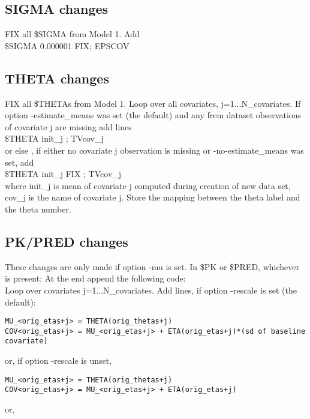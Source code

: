 \subsection{SIGMA changes}
FIX all \$SIGMA from Model 1.
Add\\
\$SIGMA 0.000001 FIX; EPSCOV

\subsection{THETA changes}
FIX all \$THETAs from Model 1.
Loop over all covariates, j=1...N\_covariates. %
If option -estimate\_means was set (the default)
and any frem dataset observations of covariate j are missing add lines\\
\$THETA init\_j ; TVcov\_j\\
or else , if either no covariate j observation is missing or
-no-estimate\_means was set, add \\
\$THETA init\_j FIX ; TVcov\_j\\
where init\_j is mean of covariate j computed during creation
of new data set, cov\_j is the name of covariate
j. %
Store the mapping between the theta label and the theta number.%
\subsection{PK/PRED changes}
These changes are only made if option -mu is set.
In \$PK or \$PRED, whichever is present:
At the end append the following code: \\
Loop over covariates j=1...N\_covariates. %
Add lines, if option -rescale is set (the default):
\begin{verbatim}
MU_<orig_etas+j> = THETA(orig_thetas+j)
COV<orig_etas+j> = MU_<orig_etas+j> + ETA(orig_etas+j)*(sd of baseline covariate)
\end{verbatim}
or, if option -rescale is unset,
\begin{verbatim}
MU_<orig_etas+j> = THETA(orig_thetas+j)
COV<orig_etas+j> = MU_<orig_etas+j> + ETA(orig_etas+j)
\end{verbatim}
or,
